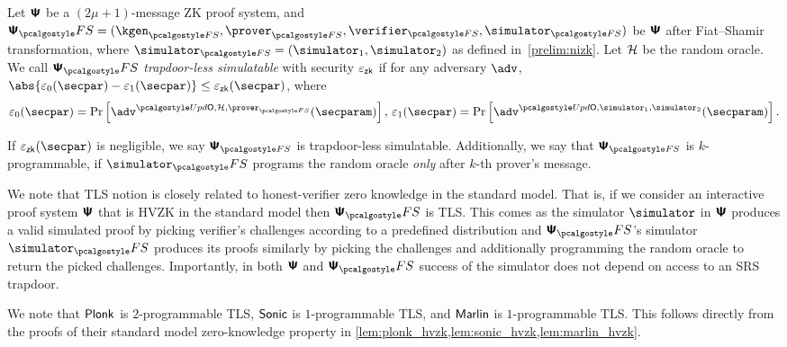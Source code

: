\begin{definition}
  \label{def:tls}
  Let $\bm{\mathsf{\Psi}}$ be a $(2\mu + 1)$-message ZK proof system, and
  $\ps_\fs= (\kgen_{\fs}, \prover_{\fs}, \verifier_{\fs}, \simulator_{\fs})$ be $\bm{\mathsf{\Psi}}$ after Fiat--Shamir transformation, where $\simulator_{\fs} = (\simulator_1, \simulator_2)$ as defined in~\cref{prelim:nizk}. Let $\mathcal{H}$ be the random oracle. 
  We call $\psfs$ \emph{trapdoor-less simulatable} with security $\varepsilon_{\mathsf{zk}}$ if for any
  adversary $\adv$, $\abs{\eps_0(\secpar) - \eps_1(\secpar)} \leq \epszk(\secpar)$, where
  \begin{align*}
    \eps_0 (\secpar) = \Pr\left[ \adv^{\initU, \ro, \prover_{\fs}} (\secparam) \right],\,
    \eps_1 (\secpar)=  \Pr \left[\adv^{\initU, \simulator_1, \simulator_2} (\secparam) \right].
  \end{align*}
  
  If $\epszk(\secpar)$ is negligible, we say $\ps_{\fs}$ is trapdoor-less simulatable. Additionally, we say that $\ps_{\fs}$ is $k$-programmable, if $\simulator_\fs$
  programs the random oracle \emph{only} after $k$-th prover's message.
  \end{definition}

  
\begin{remark}
  We note that TLS notion is closely related to honest-verifier zero knowledge in the
  standard model. That is, if we consider an interactive proof system $\bm{\mathsf{\Psi}}$
  that is HVZK in the standard model then $\proofsystem_\fs$ is TLS. This comes as the simulator $\simulator$ in
  $\bm{\mathsf{\Psi}}$ produces a valid simulated proof by picking verifier's challenges
  according to a predefined distribution and $\proofsystem_\fs$'s simulator
  $\simulator_\fs$ produces its proofs similarly by picking the challenges and
  additionally programming the random oracle to return the picked
  challenges. Importantly, in both $\bm{\mathsf{\Psi}}$ and $\proofsystem_\fs$ success of
  the simulator does not depend on access to an SRS trapdoor.
\end{remark}

We note that $\textnormal{\textsf{Plonk}}$ is $2$-programmable TLS, ${\textnormal{\textsf{Sonic}}}$ is $1$-programmable TLS,
and ${\textnormal{\textsf{Marlin}}}$ is $1$-programmable TLS. This follows directly from the proofs of
their standard model zero-knowledge property in
\cref{lem:plonk_hvzk,lem:sonic_hvzk,lem:marlin_hvzk}. 

